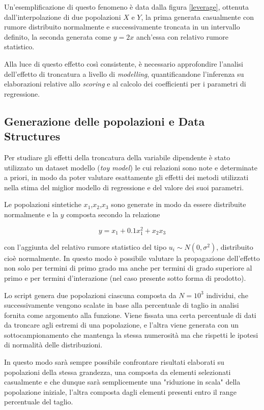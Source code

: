 \documentclass[12pt,openright,twoside,a4paper]{book}
\begin{document}
Un'esemplificazione di questo fenomeno è data dalla figura \ref{leverage}, ottenuta dall'interpolazione di due popolazioni $X$ e $Y$, la prima generata casualmente con rumore distribuito normalmente e successivamente troncata in un intervallo definito, la seconda generata come $y=2x$ anch'essa con relativo rumore statistico.

Alla luce di questo effetto così consistente, è necessario approfondire l'analisi dell'effetto di troncatura a livello di \textit{modelling}, quantificandone l'inferenza su elaborazioni relative allo \textit{scoring} e al calcolo dei coefficienti per i parametri di regressione.

\subsection{Generazione delle popolazioni e Data Structures}

Per studiare gli effetti della troncatura della variabile dipendente è stato utilizzato un dataset modello (\textit{toy model}) le cui relazioni sono note e determinate a priori, in modo da poter valutare esattamente gli effetti dei metodi utilizzati nella stima del miglior modello di regressione e del valore dei suoi parametri.

Le popolazioni sintetiche $x_1$,$x_2$,$x_3$ sono generate in modo da essere distribuite normalmente e la $y$ composta secondo la relazione

\begin{equation}
y=x_1+0.1x_1^2+x_2x_3
\label{population}
\end{equation}

con l'aggiunta del relativo rumore statistico del tipo $u_i \sim N(0,\sigma^2) $, distribuito cioè normalmente.
In questo modo è possibile valutare la propagazione dell'effetto non solo per termini di primo grado ma anche per  termini di grado superiore al primo e per termini d'interazione (nel caso presente sotto forma di prodotto).

Lo script genera due popolazioni ciascuna composta da $N=10^3$ individui, che successivamente vengono scalate in base alla percentuale di taglio in analisi fornita come argomento alla funzione. Viene fissata una certa percentuale di dati da troncare agli estremi di una popolazione, e l'altra viene generata con un sottocampionamento che mantenga la stessa numerosità ma che rispetti le ipotesi di normalità delle distribuzioni.

In questo modo sarà sempre possibile confrontare risultati elaborati su popolazioni della stessa grandezza, una composta da elementi selezionati casualmente e che dunque sarà semplicemente una "riduzione in scala" della popolazione iniziale, l'altra composta dagli elementi presenti entro il range percentuale del taglio.
\end{document}
